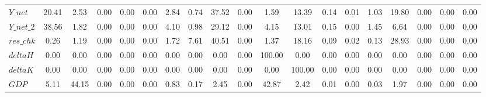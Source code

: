 \begin{center}
\begin{longtable}{lcccccccccccccccccc}
$Y\_net             $	 & 	            20.41	 & 	             2.53	 & 	             0.00	 & 	             0.00	 & 	             0.00	 & 	             2.84	 & 	             0.74	 & 	            37.52	 & 	             0.00	 & 	             1.59	 & 	            13.39	 & 	             0.14	 & 	             0.01	 & 	             1.03	 & 	            19.80	 & 	             0.00	 & 	             0.00	 & 	             0.00 \\ 
$Y\_net\_2          $	 & 	            38.56	 & 	             1.82	 & 	             0.00	 & 	             0.00	 & 	             0.00	 & 	             4.10	 & 	             0.98	 & 	            29.12	 & 	             0.00	 & 	             4.15	 & 	            13.01	 & 	             0.15	 & 	             0.00	 & 	             1.45	 & 	             6.64	 & 	             0.00	 & 	             0.00	 & 	             0.00 \\ 
$res\_chk           $	 & 	             0.26	 & 	             1.19	 & 	             0.00	 & 	             0.00	 & 	             0.00	 & 	             1.72	 & 	             7.61	 & 	            40.51	 & 	             0.00	 & 	             1.37	 & 	            18.16	 & 	             0.09	 & 	             0.02	 & 	             0.13	 & 	            28.93	 & 	             0.00	 & 	             0.00	 & 	             0.00 \\ 
$deltaH             $	 & 	             0.00	 & 	             0.00	 & 	             0.00	 & 	             0.00	 & 	             0.00	 & 	             0.00	 & 	             0.00	 & 	             0.00	 & 	             0.00	 & 	           100.00	 & 	             0.00	 & 	             0.00	 & 	             0.00	 & 	             0.00	 & 	             0.00	 & 	             0.00	 & 	             0.00	 & 	             0.00 \\ 
$deltaK             $	 & 	             0.00	 & 	             0.00	 & 	             0.00	 & 	             0.00	 & 	             0.00	 & 	             0.00	 & 	             0.00	 & 	             0.00	 & 	             0.00	 & 	             0.00	 & 	           100.00	 & 	             0.00	 & 	             0.00	 & 	             0.00	 & 	             0.00	 & 	             0.00	 & 	             0.00	 & 	             0.00 \\ 
$GDP                $	 & 	             5.11	 & 	            44.15	 & 	             0.00	 & 	             0.00	 & 	             0.00	 & 	             0.83	 & 	             0.17	 & 	             2.45	 & 	             0.00	 & 	            42.87	 & 	             2.42	 & 	             0.01	 & 	             0.00	 & 	             0.03	 & 	             1.97	 & 	             0.00	 & 	             0.00	 & 	             0.00 \\ 

\end{longtable}
\end{center}
